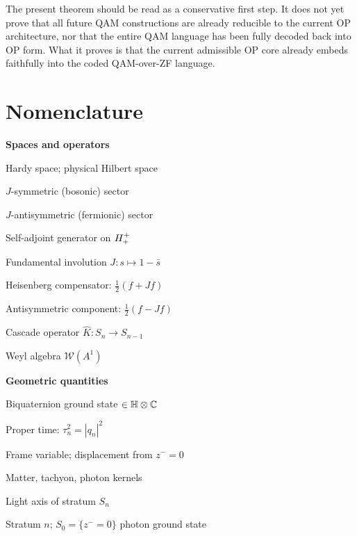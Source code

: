 \begin{remark}
The present theorem should be read as a conservative first step. It does not yet prove that all future QAM constructions are already reducible to the current OP architecture, nor that the entire QAM language has been fully decoded back into OP form. What it proves is that the current admissible OP core already embeds faithfully into the coded QAM-over-ZF language.
\end{remark}

\section*{Nomenclature}

\noindent\begin{minipage}[t]{0.48\textwidth}
\small
\noindent\textbf{Spaces and operators}
\begin{description}[leftmargin=1.8em, labelindent=0pt, itemsep=1pt]
  \item[$\Hplus$] Hardy space; physical Hilbert space
  \item[$\Hplusplus$] $J$-symmetric (bosonic) sector
  \item[$\Hplusminus$] $J$-antisymmetric (fermionic) sector
  \item[$L_0$] Self-adjoint generator on $\Hplusplus$
  \item[$J$] Fundamental involution $J:s\mapsto 1-\bar s$
  \item[$C(f)$] Heisenberg compensator: $\tfrac{1}{2}(f+Jf)$
  \item[$A(f)$] Antisymmetric component: $\tfrac{1}{2}(f-Jf)$
  \item[$\KC$] Cascade operator $\hat K:S_n\to S_{n-1}$
  \item[$\WA$] Weyl algebra $\mathcal{W}(A^1)$
\end{description}

\medskip
\noindent\textbf{Geometric quantities}
\begin{description}[leftmargin=1.8em, labelindent=0pt, itemsep=1pt]
  \item[$q_n$] Biquaternion ground state $\in\mathbb{H}\otimes\mathbb{C}$
  \item[$\tau_n$] Proper time: $\tau_n^2=|q_n|^2$
  \item[$\zminus$] Frame variable; displacement from $z^-=0$
  \item[$K_1,K_2,K_3$] Matter, tachyon, photon kernels
  \item[$L_n$] Light axis of stratum $S_n$
  \item[$S_n$] Stratum $n$; $S_0=\{z^-=0\}$ photon ground state
\end{description}


\end{minipage}
